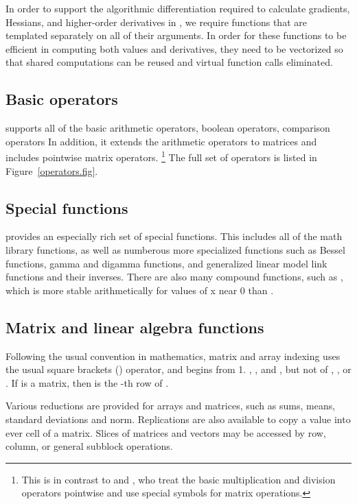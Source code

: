 \documentclass[article]{jss}
\begin{document}
In order to support the algorithmic differentiation required to
calculate gradients, Hessians, and higher-order derivatives in
, we require  functions that are 
templated separately on all of their arguments.  In order for these
functions to be efficient in computing both values and derivatives,
they need to be vectorized so that shared computations can be reused
and virtual function calls eliminated.

\subsection{Basic operators}

 supports all of the basic  arithmetic
operators, boolean operators, comparison operators  In addition, it
extends the arithmetic operators to matrices and includes pointwise
matrix operators.%
%
\footnote{This is in contrast to  and , who
  treat the basic multiplication and division operators pointwise and
  use special symbols for matrix operations.}
%
The full set of operators is listed in Figure~\ref{operators.fig}.

\subsection{Special functions}

 provides an especially rich set of special functions.
This includes all of the  math library functions, as
well as numberous more specialized functions such as Bessel functions,
gamma and digamma functions, and generalized linear model link functions
and their inverses.  There are also many compound functions, such as
, which is more stable arithmetically for values of x
near 0 than .


\subsection{Matrix and linear algebra functions}

Following the usual convention in mathematics, matrix and array
indexing uses the usual square brackets (\code{[ ]}) operator, and
begins from 1.  , , and ,
but not of , , or .
If  is a matrix, then  is the -th
row of .

Various reductions are provided for arrays and matrices, such as sums,
means, standard deviations and norm.  Replications are also available
to copy a value into ever cell of a matrix.  Slices of matrices and
vectors may be accessed by row, column, or general subblock
operations.
\end{document}
